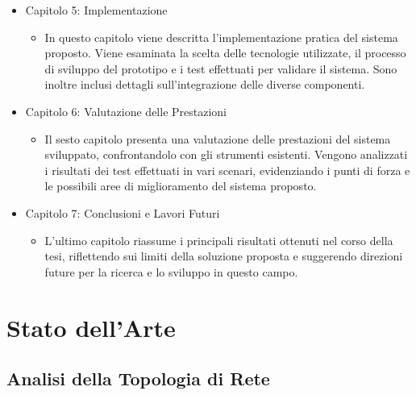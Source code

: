 \documentclass[target=bach,aauheader=,style=]{thud}
\begin{document}
\begin{itemize}
  \item Capitolo 5: Implementazione
    \begin{itemize}
      \item In questo capitolo viene descritta l'implementazione pratica del sistema proposto. Viene esaminata la scelta delle tecnologie utilizzate, il processo di sviluppo del prototipo e i test effettuati per validare il sistema. Sono inoltre inclusi dettagli sull'integrazione delle diverse componenti.
    \end{itemize}

  \item Capitolo 6: Valutazione delle Prestazioni
    \begin{itemize}
      \item Il sesto capitolo presenta una valutazione delle prestazioni del sistema sviluppato, confrontandolo con gli strumenti esistenti. Vengono analizzati i risultati dei test effettuati in vari scenari, evidenziando i punti di forza e le possibili aree di miglioramento del sistema proposto.
    \end{itemize}

  \item Capitolo 7: Conclusioni e Lavori Futuri
    \begin{itemize}
      \item L'ultimo capitolo riassume i principali risultati ottenuti nel corso della tesi, riflettendo sui limiti della soluzione proposta e suggerendo direzioni future per la ricerca e lo sviluppo in questo campo.
    \end{itemize}

\end{itemize}


\chapter{Stato dell'Arte}
\label{art}
\section{Analisi della Topologia di Rete}
\end{document}
